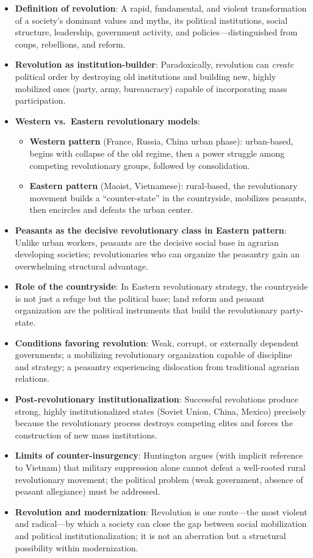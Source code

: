 \documentclass[12pt]{article}
\begin{document}
\begin{itemize}[leftmargin=*, itemsep=4pt]
    \item \textbf{Definition of revolution}: A rapid, fundamental, and violent transformation of a society's dominant values and myths, its political institutions, social structure, leadership, government activity, and policies---distinguished from coups, rebellions, and reform.
    \item \textbf{Revolution as institution-builder}: Paradoxically, revolution can \emph{create} political order by destroying old institutions and building new, highly mobilized ones (party, army, bureaucracy) capable of incorporating mass participation.
    \item \textbf{Western vs.\ Eastern revolutionary models}:
        \begin{itemize}
            \item \textbf{Western pattern} (France, Russia, China urban phase): urban-based, begins with collapse of the old regime, then a power struggle among competing revolutionary groups, followed by consolidation.
            \item \textbf{Eastern pattern} (Maoist, Vietnamese): rural-based, the revolutionary movement builds a ``counter-state'' in the countryside, mobilizes peasants, then encircles and defeats the urban center.
        \end{itemize}
    \item \textbf{Peasants as the decisive revolutionary class in Eastern pattern}: Unlike urban workers, peasants are the decisive social base in agrarian developing societies; revolutionaries who can organize the peasantry gain an overwhelming structural advantage.
    \item \textbf{Role of the countryside}: In Eastern revolutionary strategy, the countryside is not just a refuge but the political base; land reform and peasant organization are the political instruments that build the revolutionary party-state.
    \item \textbf{Conditions favoring revolution}: Weak, corrupt, or externally dependent governments; a mobilizing revolutionary organization capable of discipline and strategy; a peasantry experiencing dislocation from traditional agrarian relations.
    \item \textbf{Post-revolutionary institutionalization}: Successful revolutions produce strong, highly institutionalized states (Soviet Union, China, Mexico) precisely because the revolutionary process destroys competing elites and forces the construction of new mass institutions.
    \item \textbf{Limits of counter-insurgency}: Huntington argues (with implicit reference to Vietnam) that military suppression alone cannot defeat a well-rooted rural revolutionary movement; the political problem (weak government, absence of peasant allegiance) must be addressed.
    \item \textbf{Revolution and modernization}: Revolution is one route---the most violent and radical---by which a society can close the gap between social mobilization and political institutionalization; it is not an aberration but a structural possibility within modernization.
\end{itemize}
\end{document}
